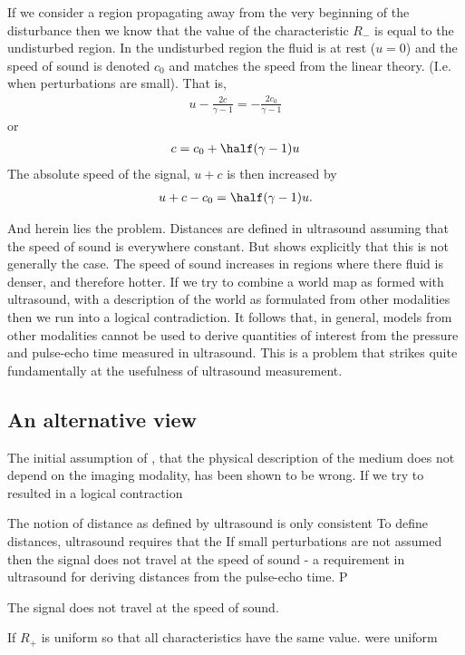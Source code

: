 If we consider a region propagating away from the very beginning of the disturbance then
we know that the value of the characteristic $R_-$ is equal to the undisturbed region.
In the undisturbed region the fluid is at rest ($u=0$) and the speed of sound is denoted $c_0$ and matches the speed from the linear theory.  (I.e. when perturbations are small). 
That is,
\begin{align}
  u - \frac{2c}{\gamma - 1} = - \frac{2c_0}{\gamma - 1}
\end{align}
or 
\begin{align}
 c = c_0  + \half (\gamma -1) u
\end{align}
The absolute speed of the signal, $u +c$ is then increased by
\begin{align}
  u + c - c_0 =  \half (\gamma -1) u.
\end{align}

And herein lies the problem.
Distances are defined in ultrasound assuming that the speed of sound is everywhere constant.
But \eqnref{} shows explicitly that this is not generally the case.
The speed of sound increases in regions where there fluid is denser, and therefore hotter.
If we try to combine a world map as formed with ultrasound, 
with a description of the world as formulated from other modalities then we run into a logical contradiction.
It follows that, in general, models from other modalities cannot be used to derive quantities of interest from the 
pressure and pulse-echo time measured in ultrasound.
This is a problem that strikes quite fundamentally at the usefulness of ultrasound measurement.


\subsection{An alternative view}
The initial assumption of \secref{}, that the physical description of the medium does not depend on the imaging modality, has been shown to be wrong.
If we try to 
resulted in a logical contraction

The notion of distance as defined by ultrasound is only consistent 
To define distances, ultrasound requires that the 
If small perturbations are not assumed then the signal does not travel at the speed of sound - a requirement in ultrasound for deriving distances from the pulse-echo time.
P


The signal does not travel at the speed of sound.  

If $R_+$ is uniform so that all characteristics have the same value. were uniform 

